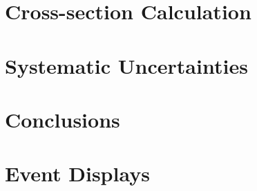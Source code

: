 \documentclass[letterpaper,12pt]{article}
\begin{document}
\section{Cross-section Calculation}

\section{Systematic Uncertainties}

\section{Conclusions}

\appendix
\section{Event Displays}

\lstset{%
    basicstyle=\scriptsize\ttfamily,
    breaklines=true
}
\end{document}

